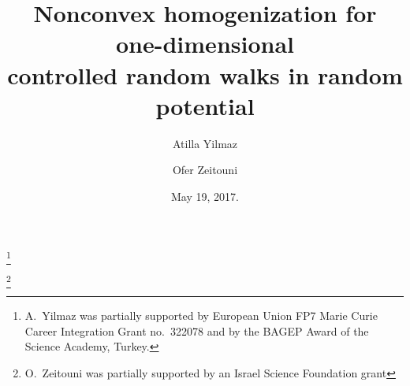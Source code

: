 \documentclass[a4paper]{amsart}
\numberwithin{equation}{section}
\theoremstyle{plain}
\theoremstyle{remark}
\begin{document}
\title[Nonconvex homogenization for 1-D controlled RW in random potential]{Nonconvex homogenization for one-dimensional \\controlled random walks in random potential}

\author[A.\ Yilmaz]{Atilla Yilmaz}
\address{Atilla Yilmaz\\ Department of Mathematics\\ Ko\c{c} University\\Rumelifeneri Yolu, Sar\i yer, Istanbul 34450, Turkey}
\thanks{A.\ Yilmaz was partially 
supported by European Union FP7 Marie Curie Career Integration Grant no.\ 322078 and by the BAGEP Award of the Science Academy, Turkey.}

\author[O.\ Zeitouni]{Ofer Zeitouni}
\address{Ofer Zeitouni\\ Faculty of Mathematics\\ Weizmann Institute \\ POB 26, Rehovot 76100\\
Israel\\and
Courant Institute\\ 251 Mercer Street\\
New York, NY 10012\\ USA}
\thanks{O.\ Zeitouni was partially supported by an Israel Science Foundation grant} 

\date{May 19, 2017.}

\end{document}
